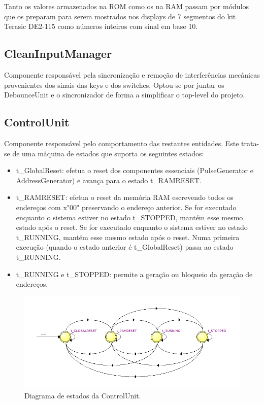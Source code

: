 \documentclass{report}
\begin{document}
Tanto os valores armazenados na ROM como os na RAM passam por módulos que os preparam para serem mostrados nos displays de 7 segmentos do kit Terasic DE2-115 como números inteiros com sinal em base 10.

\subsection*{CleanInputManager}

Componente responsável pela sincronização e remoção de interferências mecânicas provenientes dos sinais das keys e dos switches. Optou-se por juntar os DebounceUnit e o sincronizador de forma a simplificar o top-level do projeto.

\subsection*{ControlUnit}

Componente responsável pelo comportamento das restantes entidades. Este trata-se de uma máquina de estados que suporta os seguintes estados:
\begin{itemize}
    \item t\_GlobalReset: efetua o reset dos componentes essenciais (PulseGenerator e AddressGenerator) e avança para o estado t\_RAMRESET.
    \item t\_RAMRESET: efetua o reset da memória RAM escrevendo todos os endereços com x"00" preservando o endereço anterior. Se for executado enquanto o sistema estiver no estado t\_STOPPED, mantém esse mesmo estado após o reset. Se for executado enquanto o sistema estiver no estado t\_RUNNING, mantém esse mesmo estado após o reset. Numa primeira execução (quando o estado anterior é t\_GlobalReset) passa ao estado t\_RUNNING.
    \item t\_RUNNING e t\_STOPPED: permite a geração ou bloqueio da geração de endereços.
\end{itemize}

\begin{figure}[H]
    \centering
    \includegraphics[width=\textwidth]{controlunit.png}
    \caption{Diagrama de estados da ControlUnit.}
\end{figure}
\end{document}
